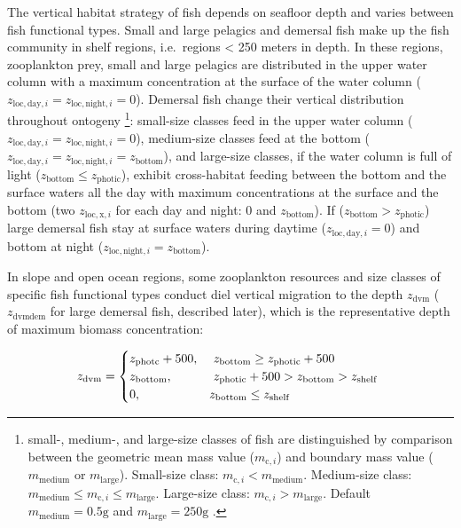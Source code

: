 \documentclass[
]{article}
\begin{document}
The vertical habitat strategy of fish depends on seafloor depth and
varies between fish functional types. Small and large pelagics and
demersal fish make up the fish community in shelf regions, i.e.~regions
\textless{} 250 meters in depth. In these regions, zooplankton prey,
small and large pelagics are distributed in the upper water column with
a maximum concentration at the surface of the water column
(\(z_{\mathrm{loc},\mathrm{day},i} = z_{\mathrm{loc},\mathrm{night},i} = 0\)).
Demersal fish change their vertical distribution throughout ontogeny
\footnote{small-, medium-, and large-size classes of fish are
  distinguished by comparison between the geometric mean mass value
  (\(m_{\mathrm{c},i}\)) and boundary mass value
  (\(m_{\mathrm{medium}}\) or \(m_{\mathrm{large}}\)). Small-size class:
  \(m_{\mathrm{c},i} < m_{\mathrm{medium}}\). Medium-size class:
  \(m_{\mathrm{medium}} \leq m_{\mathrm{c},i} \leq m_{\mathrm{large}}\).
  Large-size class: \(m_{\mathrm{c},i} > m_{\mathrm{large}}\). Default
  \(m_{\mathrm{medium}} = 0.5 \mathrm{g}\) and
  \(m_{\mathrm{large}} = 250 \mathrm{g}\) .}: small-size classes feed in
the upper water column
(\(z_{\mathrm{loc},\mathrm{day},i} = z_{\mathrm{loc},\mathrm{night},i} = 0\)),
medium-size classes feed at the bottom
(\(z_{\mathrm{loc},\mathrm{day},i} = z_{\mathrm{loc},\mathrm{night},i} = z_{\mathrm{bottom}}\)),
and large-size classes, if the water column is full of light
(\(z_{\mathrm{bottom}} \leq z_{\mathrm{photic}}\)), exhibit
cross-habitat feeding between the bottom and the surface waters all the
day with maximum concentrations at the surface and the bottom (two
\(z_{\mathrm{loc},\mathrm{x},i}\) for each day and night: 0 and
\(z_{\mathrm{bottom}}\)). If
(\(z_{\mathrm{bottom}} > z_{\mathrm{photic}}\)) large demersal fish stay
at surface waters during daytime
(\(z_{\mathrm{loc},\mathrm{day},i} = 0\)) and bottom at night
(\(z_{\mathrm{loc},\mathrm{night},i} = z_{\mathrm{bottom}}\)).

In slope and open ocean regions, some zooplankton resources and size
classes of specific fish functional types conduct diel vertical
migration to the depth \(z_{\mathrm{dvm}}\) (\(z_{\mathrm{dvmdem}}\) for
large demersal fish, described later), which is the representative depth
of maximum biomass concentration:

\begin{equation}
  z_{\mathrm{dvm}} =
  \begin{cases}
     z_{\mathrm{photc}} + 500, & \text{ $z_{\mathrm{bottom}} \geq z_{\mathrm{photic}} + 500$ } \\
     z_{\mathrm{bottom}}, & \text{ $ z_{\mathrm{photic}} + 500 > z_{\mathrm{bottom}} > z_{\mathrm{shelf}} $ } \\
     0, & \text{$ z_{\mathrm{bottom}} \leq z_{\mathrm{shelf}} $ }      
  \end{cases}
\label{eq:zdvm}
\end{equation}
\end{document}
